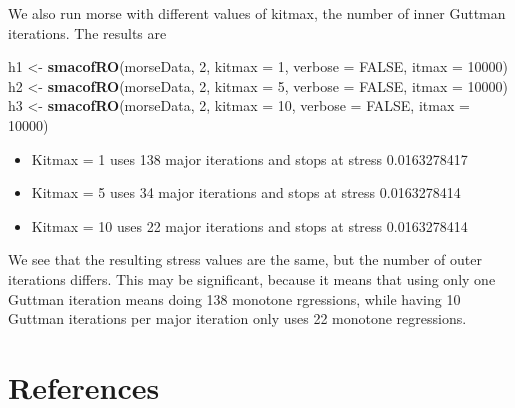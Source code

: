 \documentclass[
  12pt,
]{article}
\newenvironment{Shaded}{\begin{snugshade}}{\end{snugshade}}
\newcommand{\AttributeTok}[1]{\textcolor[rgb]{0.13,0.29,0.53}{#1}}
\newcommand{\ConstantTok}[1]{\textcolor[rgb]{0.56,0.35,0.01}{#1}}
\newcommand{\DecValTok}[1]{\textcolor[rgb]{0.00,0.00,0.81}{#1}}
\newcommand{\FunctionTok}[1]{\textcolor[rgb]{0.13,0.29,0.53}{\textbf{#1}}}
\newcommand{\NormalTok}[1]{#1}
\newcommand{\OtherTok}[1]{\textcolor[rgb]{0.56,0.35,0.01}{#1}}
\providecommand{\tightlist}{%
  \setlength{\itemsep}{0pt}\setlength{\parskip}{0pt}}
\begin{document}
We also run morse with different values of kitmax, the number of inner Guttman iterations. The results are

\begin{Shaded}
\begin{Highlighting}[]
\NormalTok{h1 }\OtherTok{\textless{}{-}} \FunctionTok{smacofRO}\NormalTok{(morseData, }\DecValTok{2}\NormalTok{, }\AttributeTok{kitmax =} \DecValTok{1}\NormalTok{, }\AttributeTok{verbose =} \ConstantTok{FALSE}\NormalTok{, }\AttributeTok{itmax =} \DecValTok{10000}\NormalTok{)}
\NormalTok{h2 }\OtherTok{\textless{}{-}} \FunctionTok{smacofRO}\NormalTok{(morseData, }\DecValTok{2}\NormalTok{, }\AttributeTok{kitmax =} \DecValTok{5}\NormalTok{, }\AttributeTok{verbose =} \ConstantTok{FALSE}\NormalTok{, }\AttributeTok{itmax =} \DecValTok{10000}\NormalTok{)}
\NormalTok{h3 }\OtherTok{\textless{}{-}} \FunctionTok{smacofRO}\NormalTok{(morseData, }\DecValTok{2}\NormalTok{, }\AttributeTok{kitmax =} \DecValTok{10}\NormalTok{, }\AttributeTok{verbose =} \ConstantTok{FALSE}\NormalTok{, }\AttributeTok{itmax =} \DecValTok{10000}\NormalTok{)}
\end{Highlighting}
\end{Shaded}

\begin{itemize}
\tightlist
\item
  Kitmax = 1 uses 138 major iterations and stops at stress 0.0163278417
\item
  Kitmax = 5 uses 34 major iterations and stops at stress 0.0163278414
\item
  Kitmax = 10 uses 22 major iterations and stops at stress 0.0163278414
\end{itemize}

We see that the resulting stress values are the same, but the number of outer iterations differs. This may be
significant, because it means that using only one Guttman iteration means doing 138 monotone
rgressions, while having 10 Guttman iterations per major iteration only uses 22 monotone
regressions.

\section*{References}\label{references}
\end{document}
